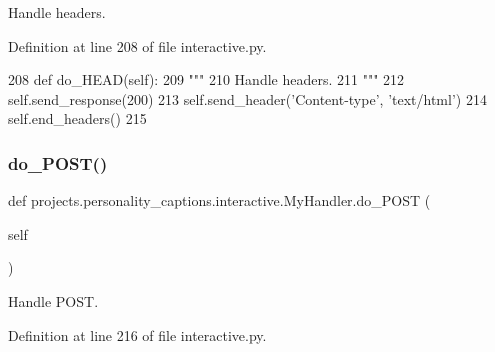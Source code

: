 \begin{DoxyVerb}Handle headers.
\end{DoxyVerb}
 

Definition at line 208 of file interactive.\+py.


\begin{DoxyCode}
208     \textcolor{keyword}{def }do\_HEAD(self):
209         \textcolor{stringliteral}{"""}
210 \textcolor{stringliteral}{        Handle headers.}
211 \textcolor{stringliteral}{        """}
212         self.send\_response(200)
213         self.send\_header(\textcolor{stringliteral}{'Content-type'}, \textcolor{stringliteral}{'text/html'})
214         self.end\_headers()
215 
\end{DoxyCode}
\mbox{\label{classprojects_1_1personality__captions_1_1interactive_1_1MyHandler_a846c973c3c91308218b79f84396265ac}} 
\subsubsection{\texorpdfstring{do\+\_\+\+P\+O\+S\+T()}{do\_POST()}}
{\footnotesize\ttfamily def projects.\+personality\+\_\+captions.\+interactive.\+My\+Handler.\+do\+\_\+\+P\+O\+ST (\begin{DoxyParamCaption}\item[{}]{self }\end{DoxyParamCaption})}

\begin{DoxyVerb}Handle POST.
\end{DoxyVerb}
 

Definition at line 216 of file interactive.\+py.


